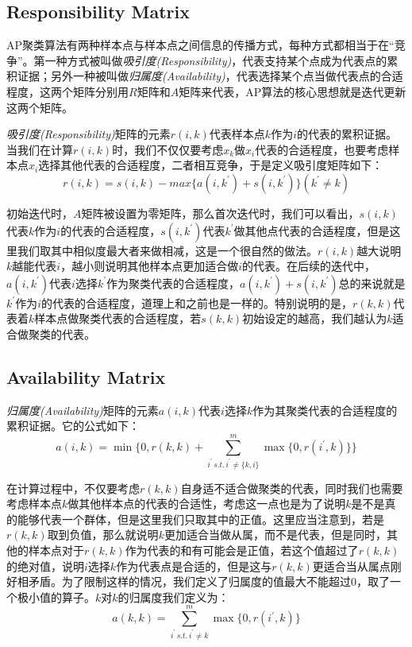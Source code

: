 \documentclass[UTF8, 12pt]{ctexart}
\begin{document}
\subsection{Responsibility Matrix}
AP聚类算法有两种样本点与样本点之间信息的传播方式，每种方式都相当于在“竞争”。第一种方式被叫做\emph{吸引度(Responsibility)}，代表支持某个点成为代表点的累积证据；另外一种被叫做\emph{归属度(Availability)}，代表选择某个点当做代表点的合适程度，这两个矩阵分别用$R$矩阵和$A$矩阵来代表，AP算法的核心思想就是迭代更新这两个矩阵。

\emph{吸引度(Responsibility)}矩阵的元素$r(i,k)$代表样本点$k$作为$i$的代表的累积证据。当我们在计算$r(i,k)$时，我们不仅仅要考虑$x_{k}$做$x_{i}$代表的合适程度，也要考虑样本点$x_{i}$选择其他代表的合适程度，二者相互竞争，于是定义吸引度矩阵如下：
\begin{equation}
	r(i,k) = s(i,k) - max\{ a(i,k^{'}) + s(i,{k^{'}})\} ({k^{'}} \ne k)
\end{equation}

初始迭代时，$A$矩阵被设置为零矩阵，那么首次迭代时，我们可以看出，$s(i,k)$代表$k$作为$i$的代表的合适程度，$s(i,k^{'})$代表$k^{'}$做其他点代表的合适程度，但是这里我们取其中相似度最大者来做相减，这是一个很自然的做法。$r(i,k)$越大说明$k$越能代表$i$，越小则说明其他样本点更加适合做$i$的代表。在后续的迭代中，$a(i,k^{'})$代表$i$选择$k^{'}$作为聚类代表的合适程度，$a(i,k^{'})+s(i,k^{'})$总的来说就是$k^{'}$作为$i$的代表的合适程度，道理上和之前也是一样的。特别说明的是，$r(k,k)$代表着$k$样本点做聚类代表的合适程度，若$s(k,k)$初始设定的越高，我们越认为$k$适合做聚类的代表。

\subsection{Availability Matrix}
\emph{归属度(Availability)}矩阵的元素$a(i,k)$代表$i$选择$k$作为其聚类代表的合适程度的累积证据。它的公式如下：
\begin{equation}
	a(i,k) = \min \{ 0,r(k,k) + \sum\limits_{{i^{'}} \, s.t. \, {i^{'}} \ne \{k, i\}}^m {\max \{ 0,r({i^{'}},k)\} } \}
\end{equation}

在计算过程中，不仅要考虑$r(k,k)$自身适不适合做聚类的代表，同时我们也需要考虑样本点$k$做其他样本点的代表的合适性，考虑这一点也是为了说明$k$是不是真的能够代表一个群体，但是这里我们只取其中的正值。这里应当注意到，若是$r(k,k)$取到负值，那么就说明$k$更加适合当做从属，而不是代表，但是同时，其他的样本点对于$r(k,k)$作为代表的和有可能会是正值，若这个值超过了$r(k,k)$的绝对值，说明$i$选择$k$作为代表点是合适的，但是这与$r(k,k)$更适合当从属点刚好相矛盾。为了限制这样的情况，我们定义了归属度的值最大不能超过0，取了一个极小值的算子。$k$对$k$的归属度我们定义为：
\begin{equation}
	a(k,k) = \sum\limits_{{i^{'}} \, s.t. \, {i^{'}} \ne k}^m {\max \{ 0,r({i^{'}},k)\} }
\end{equation}
\end{document}
